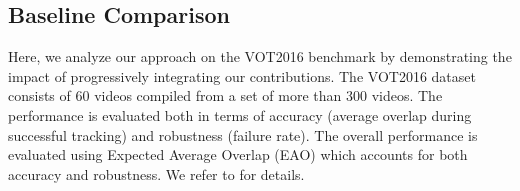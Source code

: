 \documentclass[10pt,twocolumn,letterpaper]{article}
\begin{document}
\begin{table}[!t]
	\centering
	\vspace{1mm}\caption{Analysis of our approach on the VOT2016. The impact of progressively integrating one contribution at the time, from left to right, is displayed. We show the performance in Expected Average Overlap (EAO) and speed in FPS (benchmarked on a single CPU). We also summarize the reduction in learning complexity $\ordo(N_\text{CG} D M \bar{K})$ obtained in each step, both symbolically and in absolute numbers (bottom row) using our settings. Our contributions systematically improve both performance and speed.}\label{tab:baseline}\vspace{-4mm}
\end{table}

\subsection{Baseline Comparison}
\label{sec:baseline_results}

Here, we analyze our approach on the VOT2016 benchmark by demonstrating the impact of progressively integrating our contributions. The VOT2016 dataset consists of 60 videos compiled from a set of more than 300 videos. The performance is evaluated both in terms of accuracy (average overlap during successful tracking) and robustness (failure rate). The overall performance is evaluated using Expected Average Overlap (EAO) which accounts for both accuracy and robustness. We refer to \cite{VOT2015} for details.
\end{document}
